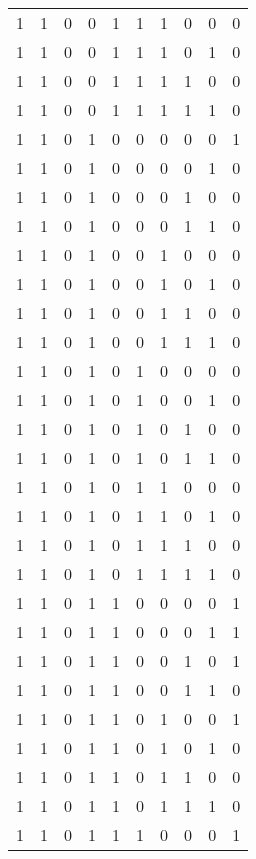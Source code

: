 \begin{longtable}[c]{rrrrrrrrrr}
        1 & 1 & 0 & 0 & 1 & 1 & 1 & 0 & 0 & 0 \\
        1 & 1 & 0 & 0 & 1 & 1 & 1 & 0 & 1 & 0 \\
        1 & 1 & 0 & 0 & 1 & 1 & 1 & 1 & 0 & 0 \\
        1 & 1 & 0 & 0 & 1 & 1 & 1 & 1 & 1 & 0 \\
        1 & 1 & 0 & 1 & 0 & 0 & 0 & 0 & 0 & 1 \\
        1 & 1 & 0 & 1 & 0 & 0 & 0 & 0 & 1 & 0 \\
        1 & 1 & 0 & 1 & 0 & 0 & 0 & 1 & 0 & 0 \\
        1 & 1 & 0 & 1 & 0 & 0 & 0 & 1 & 1 & 0 \\
        1 & 1 & 0 & 1 & 0 & 0 & 1 & 0 & 0 & 0 \\
        1 & 1 & 0 & 1 & 0 & 0 & 1 & 0 & 1 & 0 \\
        1 & 1 & 0 & 1 & 0 & 0 & 1 & 1 & 0 & 0 \\
        1 & 1 & 0 & 1 & 0 & 0 & 1 & 1 & 1 & 0 \\
        1 & 1 & 0 & 1 & 0 & 1 & 0 & 0 & 0 & 0 \\
        1 & 1 & 0 & 1 & 0 & 1 & 0 & 0 & 1 & 0 \\
        1 & 1 & 0 & 1 & 0 & 1 & 0 & 1 & 0 & 0 \\
        1 & 1 & 0 & 1 & 0 & 1 & 0 & 1 & 1 & 0 \\
        1 & 1 & 0 & 1 & 0 & 1 & 1 & 0 & 0 & 0 \\
        1 & 1 & 0 & 1 & 0 & 1 & 1 & 0 & 1 & 0 \\
        1 & 1 & 0 & 1 & 0 & 1 & 1 & 1 & 0 & 0 \\
        1 & 1 & 0 & 1 & 0 & 1 & 1 & 1 & 1 & 0 \\
        1 & 1 & 0 & 1 & 1 & 0 & 0 & 0 & 0 & 1 \\
        1 & 1 & 0 & 1 & 1 & 0 & 0 & 0 & 1 & 1 \\
        1 & 1 & 0 & 1 & 1 & 0 & 0 & 1 & 0 & 1 \\
        1 & 1 & 0 & 1 & 1 & 0 & 0 & 1 & 1 & 0 \\
        1 & 1 & 0 & 1 & 1 & 0 & 1 & 0 & 0 & 1 \\
        1 & 1 & 0 & 1 & 1 & 0 & 1 & 0 & 1 & 0 \\
        1 & 1 & 0 & 1 & 1 & 0 & 1 & 1 & 0 & 0 \\
        1 & 1 & 0 & 1 & 1 & 0 & 1 & 1 & 1 & 0 \\
        1 & 1 & 0 & 1 & 1 & 1 & 0 & 0 & 0 & 1 \\

\end{longtable}
